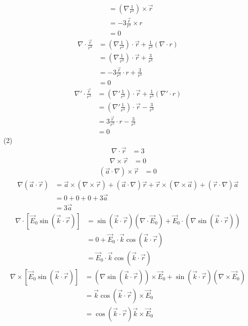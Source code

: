 \documentclass{phyasgn}
\begin{document}
\begin{sol}[2]
\begin{align*}
        &=(\nabla \frac{1}{r^3})\times \vec{r}\\
        &=-3\frac{\vec{r}}{r^5}\times r\\
        &=0
    \end{align*}
    \begin{align*}
        \nabla \cdot\frac{\vec{r}}{r^3}&=(\nabla \frac{1}{r^3})\cdot\vec{r}+\frac{1}{r^3}(\nabla\cdot r)\\
        &=(\nabla \frac{1}{r^3})\cdot\vec{r}+\frac{3}{r^3}\\
        &=-3\frac{\vec{r}}{r^5}\cdot r+\frac{3}{r^3}\\
        &=0
    \end{align*}
    \begin{align*}
        \nabla' \cdot\frac{\vec{r}}{r^3}&=(\nabla' \frac{1}{r^3})\cdot\vec{r}+\frac{1}{r^3}(\nabla'\cdot r)\\
        &=(\nabla' \frac{1}{r^3})\cdot\vec{r}-\frac{3}{r^3}\\
        &=3\frac{\vec{r}}{r^5}\cdot r-\frac{3}{r^3}\\
        &=0
    \end{align*}
    (2)\begin{align*}
        \nabla\cdot \vec{r}&=3
    \end{align*}
    \begin{align*}
        \nabla\times \vec{r}&=0
    \end{align*}
    \begin{align*}
        (\vec{a}\cdot\nabla)\times \vec{r}&=0
    \end{align*}
    \begin{align*}
        \nabla(\vec{a}\cdot \vec{r})&=\vec{a}\times(\nabla\times\vec{r})+(\vec{a}\cdot\nabla)\vec{r}+\vec{r}\times(\nabla\times\vec{a})+(\vec{r}\cdot\nabla)\vec{a}\\
        &=0+0+0+3\vec{a}\\
        &=3\vec{a}
    \end{align*}
    \begin{align*}
        \nabla\cdot[\vec{E}_0\sin (\vec{k}\cdot\vec{r})]&=\sin (\vec{k}\cdot\vec{r})(\nabla\cdot\vec{E}_0)+\vec{E}_0\cdot(\nabla\sin (\vec{k}\cdot\vec{r}))\\
        &=0+\vec{E}_0\cdot\vec{k}\cos(\vec{k}\cdot\vec{r})\\
        &=\vec{E}_0\cdot\vec{k}\cos(\vec{k}\cdot\vec{r})
    \end{align*}
    \begin{align*}
        \nabla\times[\vec{E}_0\sin (\vec{k}\cdot\vec{r})]&=(\nabla\sin (\vec{k}\cdot\vec{r}))\times\vec{E}_0+\sin (\vec{k}\cdot\vec{r})(\nabla\times\vec{E}_0)\\
        &=\vec{k}\cos(\vec{k}\cdot\vec{r})\times\vec{E}_0\\
        &=\cos(\vec{k}\cdot\vec{r})\vec{k}\times\vec{E}_0
    \end{align*}
\end{sol}\par
\end{document}
